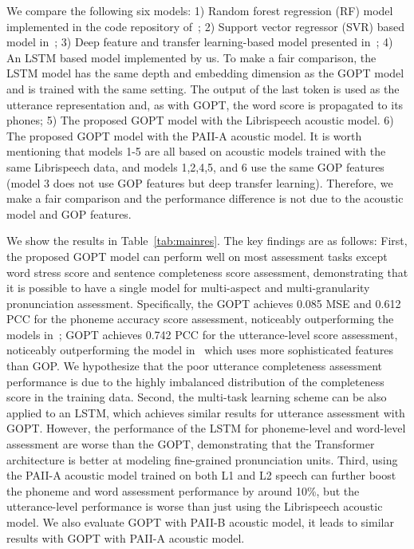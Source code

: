 \documentclass{article}
\begin{document}
We compare the following six models: 1) Random forest regression (RF) model implemented in the code repository of~\cite{zhang2021speechocean762}; 2) Support vector regressor (SVR) based model in~\cite{zhang2021speechocean762}; 3) Deep feature and transfer learning-based model presented in~\cite{lin2021deep}; 4) An LSTM based model implemented by us. To make a fair comparison, the LSTM model has the same depth and embedding dimension as the GOPT model and is trained with the same setting. The output of the last token is used as the utterance representation and, as with GOPT, the word score is propagated to its phones; 5) The proposed GOPT model with the Librispeech acoustic model. 6) The proposed GOPT model with the PAII-A acoustic model. It is worth mentioning that models 1-5 are all based on acoustic models trained with the same Librispeech data, and models 1,2,4,5, and 6 use the same GOP features (model 3 does not use GOP features but deep transfer learning). Therefore, we make a fair comparison and the performance difference is not due to the acoustic model and GOP features.

We show the results in Table~\ref{tab:mainres}. The key findings are as follows: First, the proposed GOPT model can perform well on most assessment tasks except word stress score and sentence completeness score assessment, demonstrating that it is possible to have a single model for multi-aspect and multi-granularity pronunciation assessment. Specifically, the GOPT achieves 0.085 MSE and 0.612 PCC for the phoneme accuracy score assessment, noticeably outperforming the models in~\cite{zhang2021speechocean762}; GOPT achieves 0.742 PCC for the utterance-level score assessment, noticeably outperforming the model in~\cite{lin2021deep} which uses more sophisticated features than GOP. We hypothesize that the poor utterance completeness assessment performance is due to the highly imbalanced distribution of the completeness score in the training data. Second, the multi-task learning scheme can be also applied to an LSTM, which achieves similar results for utterance assessment with GOPT.  However, the performance of the LSTM for phoneme-level and word-level assessment are worse than the GOPT, demonstrating that the Transformer architecture is better at modeling fine-grained pronunciation units. Third, using the PAII-A acoustic model trained on both L1 and L2 speech can further boost the phoneme and word assessment performance by around 10\%, but the utterance-level performance is worse than just using the Librispeech acoustic model. We also evaluate GOPT with PAII-B acoustic model, it leads to similar results with GOPT with PAII-A acoustic model.
\end{document}
